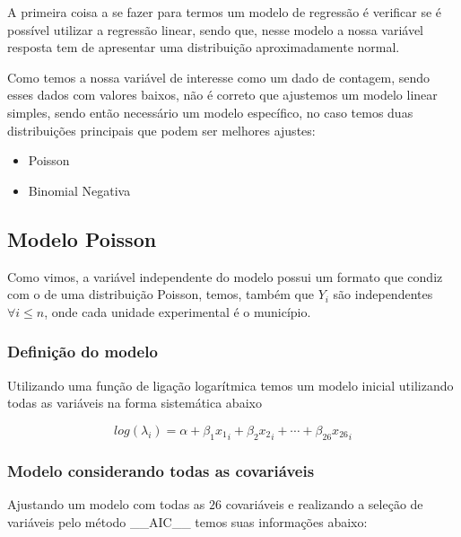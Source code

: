 \documentclass[12pt,a4paper]{article}\usepackage[]{graphicx}\usepackage[]{color}
\begin{document}
A primeira coisa a se fazer para termos um modelo de regressão é verificar se é possível utilizar a regressão linear, sendo que, nesse modelo a nossa variável resposta tem de apresentar uma distribuição aproximadamente normal.

Como temos a nossa variável de interesse como um dado de contagem, sendo esses dados com valores baixos, não é correto que ajustemos um modelo linear simples, sendo então necessário um modelo específico, no caso temos duas distribuições principais que podem ser melhores ajustes:

\begin{itemize}
  \item Poisson
  \item Binomial Negativa
\end{itemize}

\subsection{\textbf{Modelo Poisson}}

Como vimos, a variável independente do modelo possui um formato que condiz com o de uma distribuição Poisson, temos, também que $Y_i$ são independentes $\forall i \leq n$, onde cada unidade experimental é o município.

\subsubsection{\textbf{Definição do modelo}}

Utilizando uma função de ligação logarítmica temos um modelo inicial utilizando todas as variáveis na forma sistemática abaixo

$$log(\lambda_i)=\alpha+\beta_1{x_1}_i+\beta_2{x_2}_i+\cdots+\beta_{26}{x_{26}}_i$$

\subsubsection{\textbf{Modelo considerando todas as covariáveis}}

Ajustando um modelo com todas as $26$ covariáveis e realizando a seleção de variáveis pelo método \_\_AIC\_\_ temos suas informações abaixo:
\end{document}
